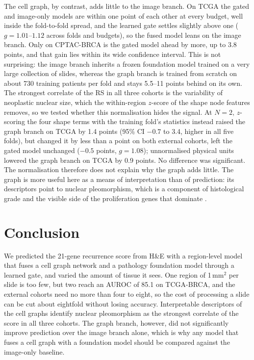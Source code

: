 \documentclass{midl} %
\begin{document}
The cell graph, by contrast, adds little to the image branch. On TCGA the gated and image-only
models are within one point of each other at every budget, well inside the fold-to-fold
spread, and the learned gate settles slightly above one ($g = 1.01$--$1.12$ across folds and
budgets), so the fused model leans on the image branch. Only on CPTAC-BRCA is the gated model
ahead by more, up to 3.8 points, and that gain lies within its wide confidence interval. This
is not surprising: the image branch inherits a frozen foundation model trained on a very large
collection of slides, whereas the graph branch is trained from scratch on about 730 training
patients per fold and stays 5.5--11 points behind on its own. The strongest correlate of the
RS in all three cohorts is the variability of neoplastic nuclear size, which the
within-region $z$-score of the shape node features removes, so we tested whether this
normalisation hides the signal. At $N=2$, $z$-scoring the four shape terms with the training
fold's statistics instead raised the graph branch on TCGA by 1.4 points (95\% CI $-0.7$ to
3.4, higher in all five folds), but changed it by less than a point on both external cohorts,
left the gated model unchanged ($-0.5$ points, $g = 1.08$); unnormalised physical units lowered
the graph branch on TCGA by 0.9 points. No difference was significant. The normalisation therefore does not explain why the graph adds little. The graph is
more useful here as a means of interpretation than of prediction: its descriptors point to nuclear
pleomorphism, which is a component of histological grade \citep{elston1991} and the visible
side of the proliferation genes that dominate .

\section{Conclusion}
\label{sec:conclusion}

We predicted the 21-gene recurrence score from H\&E with a region-level model that fuses a
cell graph network and a pathology foundation model through a learned gate, and varied the
amount of tissue it sees. One region of 1\,mm$^2$ per slide is too few, but two reach an AUROC
of 85.1 on TCGA-BRCA, and the external cohorts need no more than four to eight, so the cost of processing a slide
can be cut about eightfold without losing accuracy. Interpretable descriptors of the
cell graphs identify nuclear pleomorphism as the strongest correlate of the score in all three
cohorts. The graph branch, however, did not significantly improve prediction over the image
branch alone, which is why any model that fuses a cell graph with a foundation model should be
compared against the image-only baseline.
\end{document}
